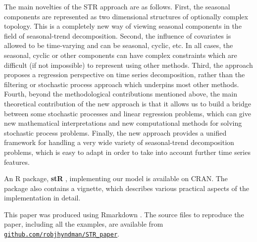 \documentclass[11pt,a4paper,]{article}
\begin{document}
The main novelties of the STR approach are as follows. First, the seasonal components are represented as two dimensional structures of optionally complex topology. This is a completely new way of viewing seasonal components in the field of seasonal-trend decomposition. Second, the influence of covariates is allowed to be time-varying and can be seasonal, cyclic, etc. In all cases, the seasonal, cyclic or other components can have complex constraints which are difficult (if not impossible) to represent using other methods. Third, the approach proposes a regression perspective on time series decomposition, rather than the filtering or stochastic process approach which underpins most other methods. Fourth, beyond the methodological contributions mentioned above, the main theoretical contribution of the new approach is that it allows us to build a bridge between some stochastic processes and linear regression problems, which can give new mathematical interpretations and new computational methods for solving stochastic process problems. Finally, the new approach provides a unified framework for handling a very wide variety of seasonal-trend decomposition problems, which is easy to adapt in order to take into account further time series features.

An R package, \textbf{stR} \autocite{stR}, implementing our model is available on CRAN.
The package also contains a vignette, which describes various practical aspects of the implementation in detail.

This paper was produced using Rmarkdown \autocite{rmarkdown}. The source files to reproduce the paper, including all the examples, are available from \href{https://github.com/robjhyndman/STR_paper}{\texttt{github.com/robjhyndman/STR\_paper}}.

\newpage

\printbibliography
\end{document}
